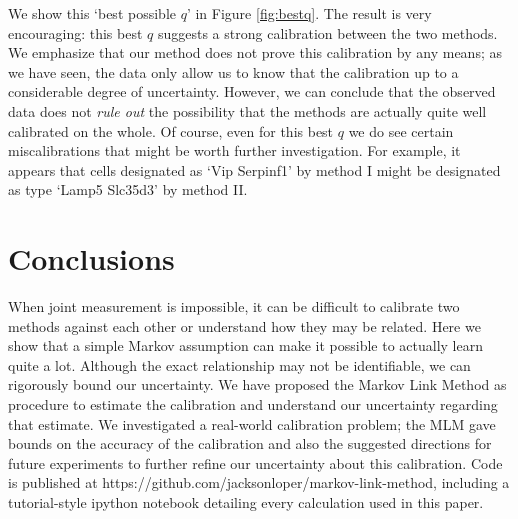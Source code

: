 
We show this `best possible $q$' in Figure \ref{fig:bestq}.  The result is very encouraging: this best $q$ suggests a strong calibration between the two methods.  We emphasize that our method does not prove this calibration by any means; as we have seen, the data only allow us to know that the calibration up to a considerable degree of uncertainty.  However, we can conclude that the observed data does not \emph{rule out} the possibility that the methods are actually quite well calibrated on the whole.  Of course, even for this best $q$ we do see certain miscalibrations that might be worth further investigation.  For example, it appears that cells designated as `Vip Serpinf1' by method I might be designated as type `Lamp5 Slc35d3' by method II.  


\section{Conclusions}

When joint measurement is impossible, it can be difficult to calibrate two methods against each other or understand how they may be related.  Here we show that a simple Markov assumption can make it possible to actually learn quite a lot.  Although the exact relationship may not be identifiable, we can rigorously bound our uncertainty.  We have proposed the Markov Link Method as procedure to estimate the calibration and understand our uncertainty regarding that estimate.  We investigated a real-world calibration problem; the MLM gave bounds on the accuracy of the calibration and also the suggested directions for future experiments to further refine our uncertainty about this calibration.  Code is published at https://github.com/jacksonloper/markov-link-method, including a tutorial-style ipython notebook detailing every calculation used in this paper.

